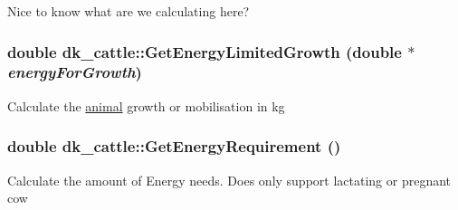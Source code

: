 \label{classdk__cattle_a419381e2c60d8fafc3d1ba70a73994e7}
Nice to know what are we calculating here? \hypertarget{classdk__cattle_a687c519c4525449e126072abf555358c}{
\subsubsection[{GetEnergyLimitedGrowth}]{\setlength{\rightskip}{0pt plus 5cm}double dk\_\-cattle::GetEnergyLimitedGrowth (double $\ast$ {\em energyForGrowth})}}
\label{classdk__cattle_a687c519c4525449e126072abf555358c}
Calculate the \hyperlink{classanimal}{animal} growth or mobilisation in kg \hypertarget{classdk__cattle_a95c52a8ad9b041ebbf28613c7f1b144a}{
\subsubsection[{GetEnergyRequirement}]{\setlength{\rightskip}{0pt plus 5cm}double dk\_\-cattle::GetEnergyRequirement ()}}
\label{classdk__cattle_a95c52a8ad9b041ebbf28613c7f1b144a}
Calculate the amount of Energy needs. Does only support lactating or pregnant cow 

